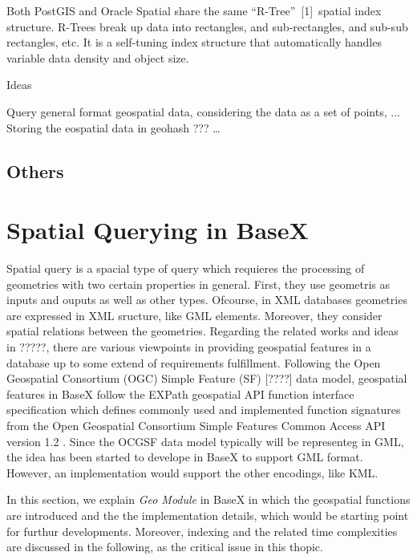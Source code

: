 \documentclass[a4paper,12pt]{article}
\begin{document}
Both PostGIS and Oracle Spatial share the same “R-Tree” [1] spatial index structure. R-Trees break up data into rectangles, and sub-rectangles, and sub-sub rectangles, etc. It is a self-tuning index structure that automatically handles variable data density and object size.

Ideas

Query general format geospatial data, considering the data as a set of points, ...
Storing the eospatial data in geohash ???
…


\subsection{Others}
\newpage

















\section{Spatial Querying in BaseX}
\label{s.basex}
Spatial query is a spacial type of query which requieres the processing of geometries with two certain properties in general. First, they use geometris as inputs and ouputs as well as other types. Ofcourse, in XML databases geometries are expressed in XML sructure, like GML elements. Moreover, they consider spatial relations between the geometries. 
Regarding the related works and ideas in ?????, there are various viewpoints in providing geospatial features in a database up to some extend of requirements fulfillment. Following the Open Geospatial Consortium (OGC) Simple Feature (SF) [????] data model, geospatial features in BaseX follow the EXPath geospatial API function interface specification which defines commonly used and implemented function signatures from the Open Geospatial Consortium Simple Features Common Access API version 1.2 \cite{simpleFeature}. Since the OCGSF data model typically will be representeg in GML, the idea has been started to develope in BaseX to support GML format. However, an implementation would support the other encodings, like KML. 

In this section, we explain \textit{Geo Module} in BaseX in which the geospatial functions are introduced and the the implementation details, which would be starting point for furthur developments. Moreover, indexing and the related time complexities are discussed in the following, as the critical issue in this thopic.
\end{document}
